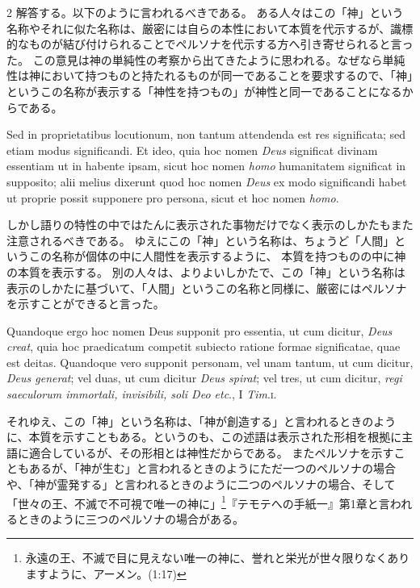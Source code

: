 \documentclass[paper=a4paper,fontsize=10pt,jafontsize=9pt,titlepage]{jlreq}
\begin{document}
\begin{paracol}{2}
解答する。以下のように言われるべきである。
ある人々はこの「神」という名称やそれに似た名称は、厳密には自らの本性において本質を代示するが、識標的なものが結び付けられることでペルソナを代示する方へ引き寄せられると言った。
この意見は神の単純性の考察から出てきたように思われる。なぜなら単純性は神において持つものと持たれるものが同一であることを要求するので、「神」というこの名称が表示する「神性を持つもの」が神性と同一であることになるからである。

\switchcolumn*

Sed in
proprietatibus locutionum, non tantum attendenda est res significata;
sed etiam modus significandi. Et ideo, quia hoc nomen \textit{Deus} significat
divinam essentiam ut in habente ipsam, sicut hoc nomen \textit{homo} humanitatem
significat in supposito; alii melius dixerunt quod hoc nomen \textit{Deus} ex
modo significandi habet ut proprie possit supponere pro persona, sicut
et hoc nomen \textit{homo}.

\switchcolumn

しかし語りの特性の中ではたんに表示された事物だけでなく表示のしかたもまた注意されるべきである。
ゆえにこの「神」という名称は、ちょうど「人間」というこの名称が個体の中に人間性を表示するように、
本質を持つものの中に神の本質を表示する。
別の人々は、よりよいしかたで、この「神」という名称は表示のしかたに基づいて、「人間」というこの名称と同様に、厳密にはペルソナを示すことができると言った。

\switchcolumn*

Quandoque ergo hoc nomen Deus supponit pro essentia,
ut cum dicitur, \textit{Deus creat}, quia hoc praedicatum competit subiecto
ratione formae significatae, quae est deitas. Quandoque vero supponit
personam, vel unam tantum, ut cum dicitur, \textit{Deus generat}; vel duas, ut
cum dicitur \textit{Deus spirat}; vel tres, ut cum dicitur, \textit{regi saeculorum
immortali, invisibili, soli Deo etc}., I \textit{Tim}.\textsc{i}.

\switchcolumn

それゆえ、この「神」という名称は、「神が創造する」と言われるときのように、本質を示すこともある。というのも、この述語は表示された形相を根拠に主語に適合しているが、その形相とは神性だからである。
またペルソナを示すこともあるが、「神が生む」と言われるときのようにただ一つのペルソナの場合や、「神が霊発する」と言われるときのように二つのペルソナの場合、そして「世々の王、不滅で不可視で唯一の神に」\footnote{永遠の王、不滅で目に見えない唯一の神に、誉れと栄光が世々限りなくありますように、アーメン。(1:17)}『テモテへの手紙一』第1章と言われるときのように三つのペルソナの場合がある。


\end{paracol}
\end{document}
